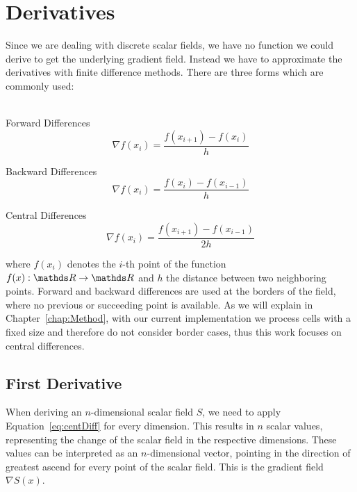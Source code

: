 \section{Derivatives}

Since we are dealing with discrete scalar fields, we have no function we
could derive to get the underlying gradient field. Instead we have to
approximate the derivatives with finite difference methods. There are
three forms which are commonly used:\\
\\
\begin{inparaenum}[(a)]
  \item Forward Differences
  \begin{equation}
    \nabla f(x_i) = \frac{f(x_{i+1}) - f(x_i)}{h}
  \end{equation}
  \item Backward Differences
  \begin{equation}
    \nabla f(x_i) = \frac{f(x_i) - f(x_{i-1})}{h}
  \end{equation}
  \item Central Differences
  \begin{equation}\label{eq:centDiff}
    \nabla f(x_i) = \frac{f(x_{i+1}) - f(x_{i-1})}{2h}
  \end{equation}
\end{inparaenum}
where $f(x_i)$ denotes the $i$-th point of the function $f(x): \real
\rightarrow \real$ and $h$ the distance between two neighboring points.
Forward and backward differences are used at the borders of the field,
where no previous or succeeding point is available. As we will explain
in Chapter~\ref{chap:Method}, with our current implementation we process
cells with a fixed size and therefore do not consider border cases, thus
this work focuses on central differences.

\subsection{First Derivative}

When deriving an $n$-dimensional scalar field $S$, we need to apply
Equation~\ref{eq:centDiff} for every dimension. This results in $n$
scalar values, representing the change of the scalar field in the
respective dimensions. These values can be interpreted as an
$n$-dimensional vector, pointing in the direction of greatest ascend for
every point of the scalar field. This is the gradient field $\nabla
S(x)$.

